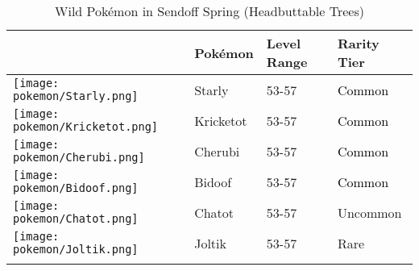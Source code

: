 \begin{longtable}{||l l l l||}%
\hline%
\rowcolor{GroundColor}%
&Pokémon&Level Range&Rarity Tier\\%
\hline%
\endhead%
\hline%
\rowcolor{GroundColor}%
\texttt{[image: pokemon/Starly.png]}&Starly&53{-}57&\textcolor{black}{%
Common%
}\\%
\hline%
\rowcolor{GroundColor}%
\texttt{[image: pokemon/Kricketot.png]}&Kricketot&53{-}57&\textcolor{black}{%
Common%
}\\%
\hline%
\rowcolor{GroundColor}%
\texttt{[image: pokemon/Cherubi.png]}&Cherubi&53{-}57&\textcolor{black}{%
Common%
}\\%
\hline%
\rowcolor{GroundColor}%
\texttt{[image: pokemon/Bidoof.png]}&Bidoof&53{-}57&\textcolor{black}{%
Common%
}\\%
\hline%
\rowcolor{GroundColor}%
\texttt{[image: pokemon/Chatot.png]}&Chatot&53{-}57&\textcolor{OliveGreen}{%
Uncommon%
}\\%
\hline%
\rowcolor{GroundColor}%
\texttt{[image: pokemon/Joltik.png]}&Joltik&53{-}57&\textcolor{RedOrange}{%
Rare%
}\\%
\hline%
\caption{Wild Pokémon in Sendoff Spring (Headbuttable Trees)}%
\label{tab:SendoffSpringHeadbuttableTrees}%
\end{longtable}